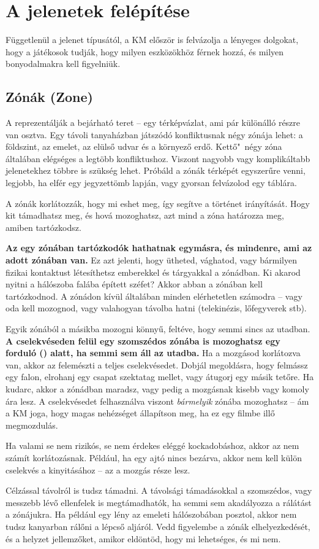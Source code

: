 \section{A jelenetek felépítése}

Függetlenül a jelenet típusától, a KM először is felvázolja a lényeges dolgokat, hogy a játékosok tudják, hogy milyen eszközökhöz férnek hozzá, és milyen bonyodalmakra kell figyelniük.

\label{Zónák}
\subsection[Zónák]{Zónák (Zone)}

A  reprezentálják a bejárható teret -- egy térképvázlat, ami pár különálló részre van osztva. Egy távoli tanyaházban játszódó konfliktusnak négy zónája lehet: a földszint, az emelet, az elülső udvar és a környező erdő. Kettő"~négy zóna általában elégséges a legtöbb konfliktushoz. Viszont nagyobb vagy komplikáltabb jelenetekhez többre is szükség lehet. Próbáld a zónák térképét egyszerűre venni, legjobb, ha elfér egy jegyzettömb lapján, vagy gyorsan felvázolod egy táblára.

A zónák korlátozzák, hogy mi eshet meg, így segítve a történet irányítását. Hogy kit támadhatsz meg, és hová mozoghatsz, azt mind a zóna határozza meg, amiben tartózkodsz.

\textbf{Az egy zónában tartózkodók hathatnak egymásra, és mindenre, ami az adott zónában van.} Ez azt jelenti, hogy ütheted, vághatod, vagy bármilyen fizikai kontaktust létesíthetsz emberekkel és tárgyakkal a zónádban. Ki akarod nyitni a hálószoba falába épített széfet? Akkor abban a zónában kell tartózkodnod. A zónádon kívül általában minden elérhetetlen számodra -- vagy oda kell mozognod, vagy valahogyan távolba hatni (telekinézis, lőfegyverek stb).

Egyik zónából a másikba mozogni könnyű, feltéve, hogy semmi sincs az utadban. \textbf{A cselekvéseden felül egy szomszédos zónába is mozoghatsz egy forduló () alatt, ha semmi sem áll az utadba.} Ha a mozgásod korlátozva van, akkor az felemészti a teljes cselekvésedet. Dobjál megoldásra, hogy felmássz egy falon, elrohanj egy csapat szektatag mellet, vagy átugorj egy másik tetőre. Ha kudarc, akkor a zónádban maradsz, vagy pedig a mozgásnak kisebb vagy komoly ára lesz. A cselekvésedet felhasználva viszont \emph{bármelyik} zónába mozoghatsz -- ám a KM joga, hogy magas nehézséget állapítson meg, ha ez egy filmbe illő megmozdulás.

Ha valami se nem rizikós, se nem érdekes eléggé kockadobáshoz, akkor az nem számít korlátozásnak. Például, ha egy ajtó nincs bezárva, akkor nem kell külön cselekvés a kinyitásához -- az a mozgás része lesz.

Célzással távolról is tudsz támadni. A távolsági támadásokkal a szomszédos, vagy messzebb lévő ellenfelek is megtámadhatók, ha semmi sem akadályozza a rálátást a zónájukra. Ha például egy lény az emeleti hálószobában posztol, akkor nem tudsz kanyarban rálőni a lépcső aljáról. Vedd figyelembe a zónák elhelyezkedését, és a helyzet jellemzőket, amikor eldöntöd, hogy mi lehetséges, és mi nem.
